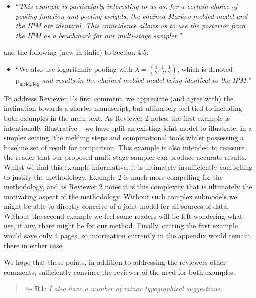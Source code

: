 \documentclass[
  10pt,
  a4paper,
]{article}
\providecommand{\tightlist}{%
  \setlength{\itemsep}{0pt}\setlength{\parskip}{0pt}}
\newcommand{\pd}{\text{p}}
\begin{document}
\begin{itemize}
\tightlist
\item
  ``\emph{This example is particularly interesting to us as, for a
  certain choice of pooling function and pooling weights, the chained
  Markov melded model and the IPM are identical. This coincidence allows
  us to use the posterior from the IPM as a benchmark for our
  multi-stage sampler.}''
\end{itemize}

and the following (new in italic) to Section 4.5:

\begin{itemize}
\tightlist
\item
  ``We also use logarithmic pooling with
  \(\lambda = (\frac{1}{2}, \frac{1}{2}, \frac{1}{2})\), which is
  denoted \(\pd_{\text{meld, log}}\) \emph{and results in the chained
  melded model being identical to the IPM.}''
\end{itemize}

To address Reviewer 1's first comment, we appreciate (and agree with)
the inclination towards a shorter manuscript, but ultimately feel tied
to including both examples in the main text. As Reviewer 2 notes, the
first example is intentionally illustrative -- we have split an existing
joint model to illustrate, in a simpler setting, the melding steps and
computational tools whilst possessing a baseline set of result for
comparison. This example is also intended to reassure the reader that
our proposed multi-stage sampler can produce accurate results. Whilst we
find this example informative, it is ultimately insufficiently
compelling to justify the methodology. Example 2 is much more compelling
for the methodology, and as Reviewer 2 notes it is this complexity that
is ultimately the motivating aspect of the methodology. Without such
complex submodels we might be able to directly conceive of a joint model
for all sources of data. Without the second example we feel some readers
will be left wondering what use, if any, there might be for our method.
Finally, cutting the first example would save only 4 pages, so
information currently in the appendix would remain there in either case.

We hope that these points, in addition to addressing the reviewers other
comments, sufficiently convince the reviewer of the need for both
examples.

\begin{quote}
\(\hookrightarrow\)\textbf{R1}: \emph{I also have a number of minor
typographical suggestions:}
\end{quote}
\end{document}
